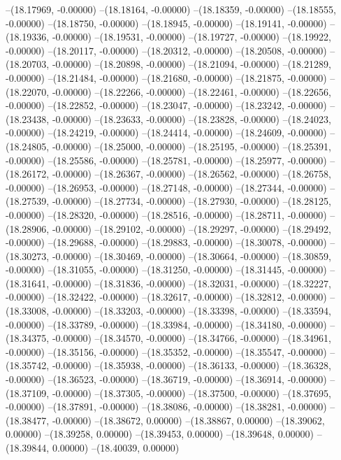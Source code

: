--(18.17969, -0.00000)
--(18.18164, -0.00000)
--(18.18359, -0.00000)
--(18.18555, -0.00000)
--(18.18750, -0.00000)
--(18.18945, -0.00000)
--(18.19141, -0.00000)
--(18.19336, -0.00000)
--(18.19531, -0.00000)
--(18.19727, -0.00000)
--(18.19922, -0.00000)
--(18.20117, -0.00000)
--(18.20312, -0.00000)
--(18.20508, -0.00000)
--(18.20703, -0.00000)
--(18.20898, -0.00000)
--(18.21094, -0.00000)
--(18.21289, -0.00000)
--(18.21484, -0.00000)
--(18.21680, -0.00000)
--(18.21875, -0.00000)
--(18.22070, -0.00000)
--(18.22266, -0.00000)
--(18.22461, -0.00000)
--(18.22656, -0.00000)
--(18.22852, -0.00000)
--(18.23047, -0.00000)
--(18.23242, -0.00000)
--(18.23438, -0.00000)
--(18.23633, -0.00000)
--(18.23828, -0.00000)
--(18.24023, -0.00000)
--(18.24219, -0.00000)
--(18.24414, -0.00000)
--(18.24609, -0.00000)
--(18.24805, -0.00000)
--(18.25000, -0.00000)
--(18.25195, -0.00000)
--(18.25391, -0.00000)
--(18.25586, -0.00000)
--(18.25781, -0.00000)
--(18.25977, -0.00000)
--(18.26172, -0.00000)
--(18.26367, -0.00000)
--(18.26562, -0.00000)
--(18.26758, -0.00000)
--(18.26953, -0.00000)
--(18.27148, -0.00000)
--(18.27344, -0.00000)
--(18.27539, -0.00000)
--(18.27734, -0.00000)
--(18.27930, -0.00000)
--(18.28125, -0.00000)
--(18.28320, -0.00000)
--(18.28516, -0.00000)
--(18.28711, -0.00000)
--(18.28906, -0.00000)
--(18.29102, -0.00000)
--(18.29297, -0.00000)
--(18.29492, -0.00000)
--(18.29688, -0.00000)
--(18.29883, -0.00000)
--(18.30078, -0.00000)
--(18.30273, -0.00000)
--(18.30469, -0.00000)
--(18.30664, -0.00000)
--(18.30859, -0.00000)
--(18.31055, -0.00000)
--(18.31250, -0.00000)
--(18.31445, -0.00000)
--(18.31641, -0.00000)
--(18.31836, -0.00000)
--(18.32031, -0.00000)
--(18.32227, -0.00000)
--(18.32422, -0.00000)
--(18.32617, -0.00000)
--(18.32812, -0.00000)
--(18.33008, -0.00000)
--(18.33203, -0.00000)
--(18.33398, -0.00000)
--(18.33594, -0.00000)
--(18.33789, -0.00000)
--(18.33984, -0.00000)
--(18.34180, -0.00000)
--(18.34375, -0.00000)
--(18.34570, -0.00000)
--(18.34766, -0.00000)
--(18.34961, -0.00000)
--(18.35156, -0.00000)
--(18.35352, -0.00000)
--(18.35547, -0.00000)
--(18.35742, -0.00000)
--(18.35938, -0.00000)
--(18.36133, -0.00000)
--(18.36328, -0.00000)
--(18.36523, -0.00000)
--(18.36719, -0.00000)
--(18.36914, -0.00000)
--(18.37109, -0.00000)
--(18.37305, -0.00000)
--(18.37500, -0.00000)
--(18.37695, -0.00000)
--(18.37891, -0.00000)
--(18.38086, -0.00000)
--(18.38281, -0.00000)
--(18.38477, -0.00000)
--(18.38672, 0.00000)
--(18.38867, 0.00000)
--(18.39062, 0.00000)
--(18.39258, 0.00000)
--(18.39453, 0.00000)
--(18.39648, 0.00000)
--(18.39844, 0.00000)
--(18.40039, 0.00000)
